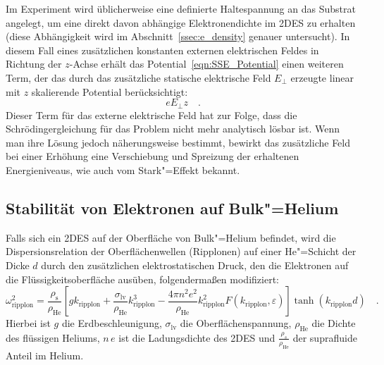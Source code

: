 Im Experiment wird üblicherweise eine definierte Haltespannung an das Substrat angelegt, um eine direkt davon abhängige Elektronendichte im 2DES zu erhalten (diese Abhängigkeit wird im Abschnitt~\ref{ssec:e_density} genauer untersucht). In diesem Fall eines zusätzlichen konstanten externen elektrischen Feldes in Richtung der $z$-Achse erhält das  Potential~\eqref{eqn:SSE_Potential} einen weiteren Term, der das durch das zusätzliche statische elektrische Feld $E_\perp$ erzeugte linear mit $z$ skalierende Potential berücksichtigt:
	\begin{equation}
			\label{eqn:clamping_potential}
			e E_\perp z\quad.
	\end{equation}
Dieser Term für das externe elektrische Feld hat zur Folge, dass die Schrödingergleichung für das Problem nicht mehr analytisch lösbar ist. Wenn man ihre Lösung jedoch näherungsweise bestimmt, bewirkt das zusätzliche Feld bei einer Erhöhung eine Verschiebung und Spreizung der erhaltenen Energieniveaus, wie auch vom Stark"=Effekt bekannt. 

\subsection{Stabilität von Elektronen auf Bulk"=Helium}
\label{ssec:bulk_stabilitaet}

Falls sich ein 2DES auf der Oberfläche von Bulk"=Helium befindet, wird die Dispersionsrelation der Oberflächenwellen (Ripplonen) auf einer He"=Schicht der Dicke $d$ durch den zusätzlichen elektrostatischen Druck, den die Elektronen auf die Flüssigkeitsoberfläche ausüben, folgendermaßen modifiziert:
\begin{equation}
    \label{eqn:ripplon_dispersion_bulk}
        \omega^2_\text{ripplon}=\frac{\rho_\text{s}}{\rho_\text{He}}\left[g k_\text{ripplon}+
            \frac{\sigma_\text{lv}}{\rho_\text{He}} k^3_\text{ripplon}-\frac{4\pi n^2e^2}{\rho_\text{He}} k^2_\text{ripplon}F(k_\text{ripplon},\varepsilon)\right]\tanh(k_\text{ripplon} d)\quad.
\end{equation}
Hierbei ist $g$ die Erdbeschleunigung, $\sigma_\text{lv}$ die Oberflächenspannung, $\rho_\text{He}$ die Dichte des flüssigen Heliums, $n\,e$ ist die Ladungsdichte des 2DES und $\frac{\rho_s}{\rho_\text{He}}$ der suprafluide Anteil im Helium.

